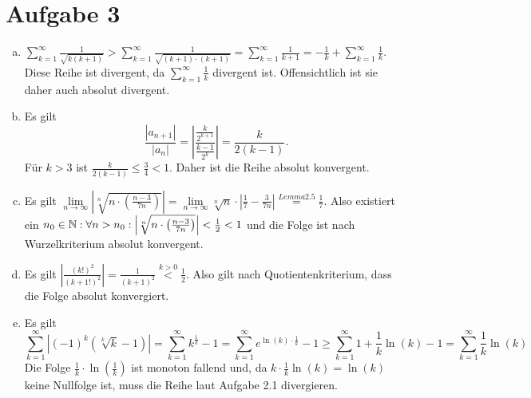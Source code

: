 \documentclass{article}
\newcommand{\mylim}{\lim\limits_{n\to \infty}}
\begin{document}
	\section*{Aufgabe 3}
	\begin{enumerate}[(a)]
		\item $\sum_{k= 1}^{\infty} \frac{1}{\sqrt{k(k+1)}} > \sum_{k= 1}^{\infty} \frac{1}{\sqrt{(k+1)\cdot (k+1)}} = \sum_{k = 1}^{\infty} \frac{1}{k+1} = -\frac{1}{k} + \sum_{k = 1}^{\infty} \frac{1}{k}$. Diese Reihe ist divergent, da $\sum_{k = 1}^{\infty} \frac{1}{k}$ divergent ist. Offensichtlich ist sie daher auch absolut divergent.
		\item Es gilt $$\frac{|a_{n+1}|}{|a_n|} = \left|\frac{\frac{k}{2^{k+1}}}{\frac{k-1}{2^k}}\right| = \frac{k}{2(k-1)}.$$ Für $k > 3$ ist $\frac{k}{2(k-1)} \leq \frac{3}{4} < 1$. Daher ist die Reihe absolut konvergent.
		\item Es gilt $\mylim \left|\sqrt[n]{n\cdot \left(\frac{n-3}{7n}\right)}\right| = \mylim \sqrt[n]{n}\cdot \left|\frac{1}{7} - \frac{3}{7n}\right| \overset{Lemma 2.5}{=} \frac{1}{7}$. Also existiert ein $n_0\in \mathbb{N}: \forall n > n_0: \left|\sqrt[n]{n\cdot \left(\frac{n-3}{7n}\right)}\right| < \frac{1}{2} < 1$ und die Folge ist nach Wurzelkriterium absolut konvergent.
		\item Es gilt $\left|\frac{(k!)^2}{(k+1!)^2}\right| = \frac{1}{(k+1)^2} \overset{k > 0}{<} \frac{1}{2}$. Also gilt nach Quotientenkriterium, dass die Folge absolut konvergiert.
		\item Es gilt $$\sum_{k= 1}^{\infty}\left| (-1)^k \left(\sqrt[k]{k} - 1\right) \right| = \sum_{k= 1}^{\infty} k^{\frac{1}{k}} -1 = \sum_{k = 1}^{\infty} e^{\ln(k) \cdot \frac{1}{k}} - 1 \geq \sum_{k = 1}^{\infty} 1 + \frac{1}{k}\ln\left(k\right) - 1 = \sum_{k = 1}^{\infty} \frac{1}{k}\ln\left(k\right)$$ Die Folge $\frac{1}{k} \cdot \ln\left(\frac{1}{k}\right)$ ist monoton fallend und, da $k\cdot \frac{1}{k}\ln(k) = \ln(k)$ keine Nullfolge ist, muss die Reihe laut Aufgabe 2.1 divergieren.
	\end{enumerate}
\end{document}
